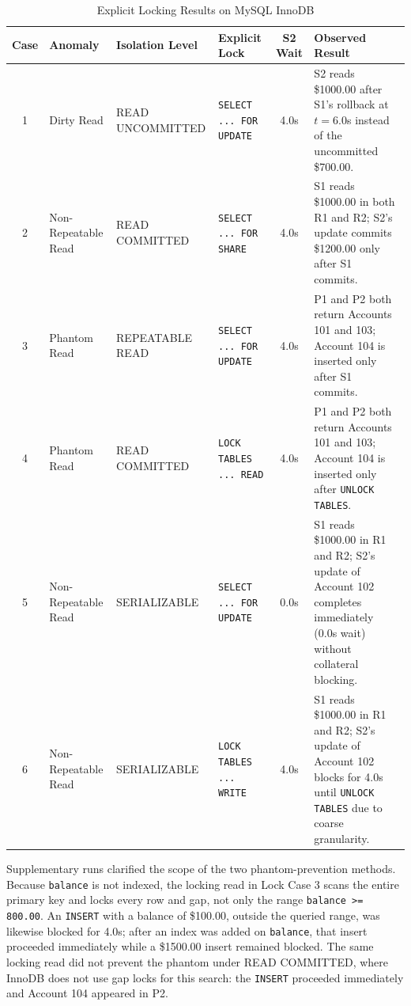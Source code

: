 \documentclass[sigconf, pbalance, nonacm]{acmart}
\begin{document}
\begin{table}[t]
\centering
\small
\caption{Explicit Locking Results on MySQL InnoDB}
\label{tab:lock_matrix}
\begin{tabularx}{\textwidth}{c l l l c X}
\toprule
\textbf{Case} & \textbf{Anomaly} & \textbf{Isolation Level} & \textbf{Explicit Lock} & \textbf{S2 Wait} & \textbf{Observed Result} \\
\midrule
1 & Dirty Read & READ UNCOMMITTED & \texttt{SELECT ... FOR UPDATE} & 4.0s & S2 reads \$1000.00 after S1's rollback at $t=6.0$s instead of the uncommitted \$700.00. \\
2 & Non-Repeatable Read & READ COMMITTED & \texttt{SELECT ... FOR SHARE} & 4.0s & S1 reads \$1000.00 in both R1 and R2; S2's update commits \$1200.00 only after S1 commits. \\
3 & Phantom Read & REPEATABLE READ & \texttt{SELECT ... FOR UPDATE} & 4.0s & P1 and P2 both return Accounts 101 and 103; Account 104 is inserted only after S1 commits. \\
4 & Phantom Read & READ COMMITTED & \texttt{LOCK TABLES ... READ} & 4.0s & P1 and P2 both return Accounts 101 and 103; Account 104 is inserted only after \texttt{UNLOCK TABLES}. \\
\midrule
5 & Non-Repeatable Read & SERIALIZABLE & \texttt{SELECT ... FOR UPDATE} & 0.0s & S1 reads \$1000.00 in R1 and R2; S2's update of Account 102 completes immediately (0.0s wait) without collateral blocking. \\
6 & Non-Repeatable Read & SERIALIZABLE & \texttt{LOCK TABLES ... WRITE} & 4.0s & S1 reads \$1000.00 in R1 and R2; S2's update of Account 102 blocks for 4.0s until \texttt{UNLOCK TABLES} due to coarse granularity. \\
\bottomrule
\end{tabularx}
\end{table}

Supplementary runs clarified the scope of the two phantom-prevention methods. Because \texttt{balance} is not indexed, the locking read in Lock Case 3 scans the entire primary key and locks every row and gap, not only the range \texttt{balance >= 800.00}. An \texttt{INSERT} with a balance of \$100.00, outside the queried range, was likewise blocked for 4.0s; after an index was added on \texttt{balance}, that insert proceeded immediately while a \$1500.00 insert remained blocked. The same locking read did not prevent the phantom under READ COMMITTED, where InnoDB does not use gap locks for this search: the \texttt{INSERT} proceeded immediately and Account 104 appeared in P2.
\end{document}
